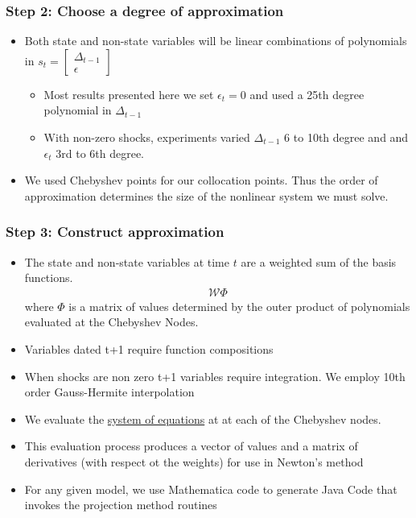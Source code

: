 \documentclass[handout]{beamer}
\begin{document}
\begin{frame}

\frametitle{Step 2: Choose a degree of approximation }
\begin{itemize}
\item Both state and non-state variables will be linear combinations
  of polynomials in $s_t=
  \begin{bmatrix}
    \Delta_{t-1}\\ \epsilon
  \end{bmatrix}$
  \begin{itemize}
  \item Most results presented here we set $\epsilon_t=0$ and used a
    25th degree polynomial in $\Delta_{t-1}$
  \item With non-zero shocks, experiments varied $\Delta_{t-1}$ 6 to
    10th degree and and $\epsilon_t$ 3rd to 6th degree.
  \end{itemize}
\item We used Chebyshev points for our collocation points.  Thus the
  order of approximation determines the size of the nonlinear system
  we must solve.
\end{itemize}

\end{frame}
\begin{frame}

\frametitle{Step 3: Construct approximation}
\begin{itemize}
\item The state and non-state variables at time $t$ are a weighted sum
  of the basis functions.
  \begin{gather*}
    \mathcal{W} \Phi
  \end{gather*}
  where $\Phi$ is a matrix of values determined by the outer product
  of polynomials evaluated at the Chebyshev Nodes.
\item Variables dated t+1 require function compositions
\item When shocks are non zero t+1 variables require integration.  We
  employ 10th order Gauss-Hermite interpolation
\item We evaluate the \hyperref[eqns]{system of equations} at at each
  of the Chebyshev nodes.
\item This evaluation process produces a vector of values and a matrix
  of derivatives (with respect ot the weights) for use in Newton's
  method
\item For any given model, we use Mathematica code to generate Java
  Code that invokes the projection method routines
\end{itemize}



\end{frame}
\end{document}
